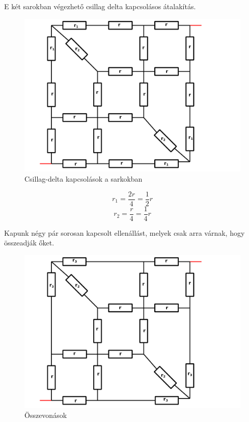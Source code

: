 \documentclass[11pt,a4paper,openany,leqno]{article}
\begin{document}
E két sarokban végezhető csillag delta kapcsolásos átalakítás.\\

\begin{figure}[h!]
\centering
  \includegraphics[width=150mm,scale=0.5]{grid_3_3.pdf}
  \caption{Csillag-delta kapcsolások a sarkokban}
  \label{}
\end{figure}
$$ r_1 = \frac{2r}{4} = \frac{1}{2} r $$
$$ r_2 = \frac{r}{4} = \frac{1}{4} r $$
\newpage

Kapunk négy pár sorosan kapcsolt ellenállást, melyek csak arra várnak, hogy összeadják őket.\\

\begin{figure}[h!]
\centering
  \includegraphics[width=150mm,scale=0.5]{grid_3_3a.pdf}
  \caption{Összevonások}
  \label{}
\end{figure}
\end{document}
